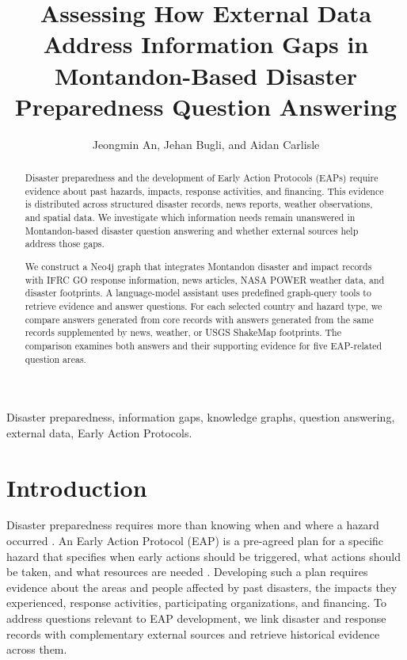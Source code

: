 \documentclass[journal]{IEEEtran}
\begin{document}
\title{Assessing How External Data Address Information Gaps in
Montandon-Based Disaster Preparedness Question Answering}

\author{Jeongmin An, Jehan Bugli, and Aidan Carlisle}

\maketitle

\begin{abstract}
Disaster preparedness and the development of Early Action Protocols
(EAPs) require evidence about past hazards, impacts, response activities,
and financing. This evidence is distributed across structured disaster
records, news reports, weather observations, and spatial data. We
investigate which information needs remain unanswered in
Montandon-based disaster question answering and whether external
sources help address those gaps.

We construct a Neo4j graph that integrates Montandon disaster and impact
records with IFRC GO response information, news articles, NASA POWER
weather data, and disaster footprints. A language-model assistant uses
predefined graph-query tools to retrieve evidence and answer questions.
For each selected country and hazard type, we compare answers
generated from core records with answers generated from the same
records supplemented by news, weather, or USGS ShakeMap footprints.
The comparison examines both answers and their supporting evidence
for five EAP-related question areas.
\end{abstract}

\begin{IEEEkeywords}
Disaster preparedness, information gaps, knowledge graphs,
question answering, external data, Early Action Protocols.
\end{IEEEkeywords}

\section{Introduction}

Disaster preparedness requires more than knowing when and where a
hazard occurred \cite{undrr2015sendai}. An Early Action Protocol
(EAP) is a pre-agreed plan for a specific hazard that specifies when
early actions should be triggered, what actions should be taken, and
what resources are needed \cite{ifrcAnticipatoryPillar}. Developing
such a plan requires evidence about the areas and people affected by
past disasters, the impacts they experienced, response activities,
participating organizations, and financing. To address questions
relevant to EAP development, we link disaster and response records
with complementary external sources and retrieve historical evidence
across them.
\end{document}
